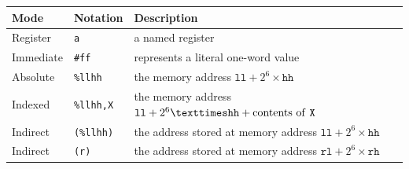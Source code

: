 \documentclass[a4paper,onecolumn,final,10pt]{memoir}
\let\ttt\texttt
\begin{document}

\begin{center}
	\begin{tabular}{|l|l|l|}
		\hline
		\textbf{Mode} & \textbf{Notation}                     & \textbf{Description}                                                    \\ \hline
		Register      & \ttt{a}                               & a named register                                                        \\ \hline
		Immediate     & \ttt{\#ff}                              & represents a literal one-word value                                     \\ \hline
		Absolute      & \ttt{\%llhh}                            & the memory address $\ttt{ll}+2^6×\ttt{hh}$                              \\ \hline
		Indexed       & \ttt{\%llhh,X}                          & the memory address $\ttt{ll}+2^6×\ttt{hh}+\textrm{contents of \ttt{X}}$ \\ \hline
		Indirect      & \hspace{-0.2em}\ttt{(\%llhh)}           & the address stored at memory address $\ttt{ll}+2^6×\ttt{hh}$            \\ \hline
		Indirect      & \hspace{-0.2em}\ttt{(r)}\footnotemark & the address stored at memory address $\ttt{rl}+2^6×\ttt{rh}$            \\ \hline
	\end{tabular}
\end{center}
\end{document}
